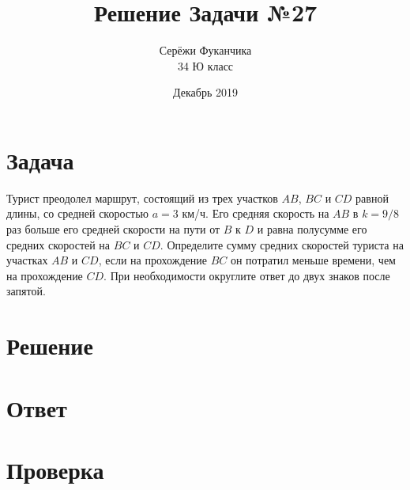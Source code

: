 \documentclass{article}
\title{Решение Задачи №27}
\author{Серёжи Фуканчика\\34 Ю класс}
\date{Декабрь 2019}
\begin{document}
\maketitle

\section{Задача}
Турист преодолел маршрут, состоящий из трех участков $AB$, $BC$ и $CD$ равной длины, со средней скоростью $a=3$ км/ч. Его средняя скорость на $AB$ в $k=9/8$ раз больше его средней скорости на пути от $B$ к $D$ и равна полусумме его средних скоростей на $BC$ и $CD$. Определите сумму средних скоростей туриста на участках $AB$ и $CD$, если на прохождение $BC$ он потратил меньше времени, чем на прохождение $CD$.
При необходимости округлите ответ до двух знаков после запятой.

\section{Решение}

\section{Ответ}

\section{Проверка}
\end{document}

